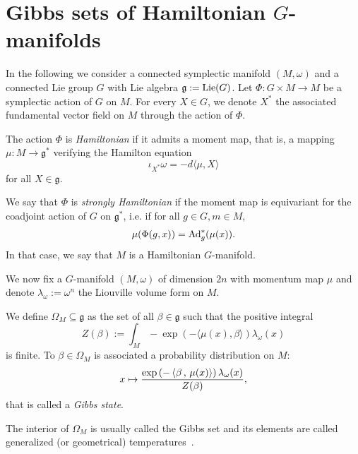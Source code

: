 \documentclass[english]{article}
\begin{document}
\section{Gibbs sets of Hamiltonian $G$-manifolds}\label{secno:GibbsSets}

In the following we consider a connected symplectic manifold $(M, \omega)$ and  a connected Lie group $G$ with Lie algebra $\mathfrak{g}:=\operatorname{Lie}(G)$. Let $\Phi: G\times M\to M$ be a symplectic action of $G$ on $M$. For every $X\in G$, we denote $X^*$ the associated fundamental vector field on $M$ through the action of $\Phi$.
\begin{definition}
   The action $\Phi$ is \emph{Hamiltonian} if it admits a moment map, that is, a  mapping $\mu: M\to \mathfrak{g}^* $ verifying the Hamilton equation
   \begin{equation*}
       \iota_{X^*}\omega=-d\langle \mu, X\rangle
   \end{equation*}
   for all $X\in \mathfrak{g}$.
   
   We say that $\Phi$ is \emph{strongly Hamiltonian} if the moment map is equivariant for the coadjoint action of $G$ on $\mathfrak{g}^*$, i.e. if for all $g\in G, m \in M$, 
   \begin{equation*}
       \mu (\Phi(g,x) ) = \operatorname{Ad}_g^* (\mu(x)).
   \end{equation*}
   In that case, we say that $M$ is a Hamiltonian $G$-manifold.
\end{definition}

 We now fix a $G$-manifold $(M, \omega)$ of dimension $2n$ with momentum map $\mu$ and denote $\lambda_\omega := \omega^n$ the Liouville volume form on $M$.

\begin{definition}
    We define $\Omega_M \subseteq \mathfrak{g}$ as the set of all $\beta\in \mathfrak{g}$ such that the positive integral
    \begin{equation}\label{eq:DefPartitionFunction}
    Z(\beta):=\int_M -\exp(-\langle \mu(x), \beta\rangle) \lambda_\omega(x)
    \end{equation}
    is finite.
    To $\beta\in \Omega_M$ is associated a probability distribution on $M$:
    \[
        x \mapsto
        \frac{
        \exp\left( - \left\langle \beta \,,\, \mu(x) \right\rangle \right) 
        \lambda_\omega (x)
        }
        {Z(\beta)}
    ,\]
    that is called a \emph{Gibbs state}.
\end{definition}%
The interior of $\Omega_M$ is usually called the Gibbs set and its elements are called generalized (or geometrical) temperatures~\cite{MarleGibbsStates, SSDEng, SouriauMecaStat}.
\end{document}
